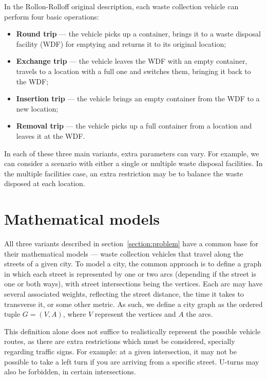 In the Rollon-Rolloff original description, each waste collection vehicle can
perform four basic operations:

\begin{itemize}
\item \textbf{Round trip} --- the vehicle picks up a container, brings it to a
waste disposal facility (WDF) for emptying and returns it to its original
location;

\item \textbf{Exchange trip} --- the vehicle leaves the WDF with an empty
container, travels to a location with a full one and switches them, bringing it
back to the WDF;

\item \textbf{Insertion trip} --- the vehicle brings an empty container from
the WDF to a new location;

\item \textbf{Removal trip} --- the vehicle picks up a full container from a
location and leaves it at the WDF.
\end{itemize}

In each of these three main variants, extra parameters can vary. For example,
we can consider a scenario with either a single or multiple waste disposal
facilities. In the multiple facilities case, an extra restriction may be to
balance the waste disposed at each location.

\section{Mathematical models}
\label{section:math}

All three variants described in section~\ref{section:problem} have a common
base for their mathematical models --- waste collection vehicles that travel
along the streets of a given city. To model a city, the common approach is to
define a graph in which each street is represented by one or two arcs
(depending if the street is one or both ways), with street intersections being
the vertices. Each arc may have several associated weights, reflecting the
street distance, the time it takes to transverse it, or some other metric. As
such, we define a city graph as the ordered tuple $G = (V, A)$, where $V$
represent the vertices and $A$ the arcs.

This definition alone does not suffice to realistically represent the possible
vehicle routes, as there are extra restrictions which must be considered,
specially regarding traffic signs. For example: at a given intersection, it may
not be possible to take a left turn if you are arriving from a specific street.
U-turns may also be forbidden, in certain intersections. 

